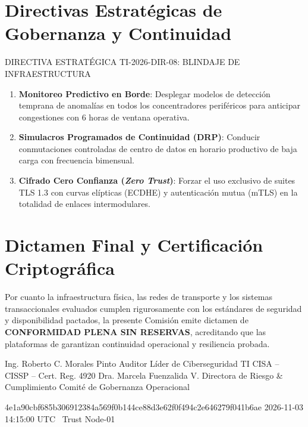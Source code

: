 \documentclass[11pt,letterpaper]{article}
\begin{document}
\newpage

\section{Directivas Estrat\'egicas de Gobernanza y Continuidad}

\begin{corpdirective}{DIRECTIVA ESTRAT\'EGICA TI-2026-DIR-08: BLINDAJE DE INFRAESTRUCTURA}
  \begin{enumerate}[leftmargin=1.5em, itemsep=3pt, topsep=2pt]
    \item \textbf{Monitoreo Predictivo en Borde}: Desplegar modelos de detecci\'on temprana de anomal\'ias en todos los concentradores perif\'ericos para anticipar congestiones con 6 horas de ventana operativa.
    \item \textbf{Simulacros Programados de Continuidad (DRP)}: Conducir conmutaciones controladas de centro de datos en horario productivo de baja carga con frecuencia bimensual.
    \item \textbf{Cifrado Cero Confianza (\textit{Zero Trust})}: Forzar el uso exclusivo de suites TLS 1.3 con curvas el\'ipticas (ECDHE) y autenticaci\'on mutua (mTLS) en la totalidad de enlaces intermodulares.
  \end{enumerate}
\end{corpdirective}

\section{Dictamen Final y Certificaci\'on Criptogr\'afica}

Por cuanto la infraestructura f\'isica, las redes de transporte y los sistemas transaccionales evaluados cumplen rigurosamente con los est\'andares de seguridad y disponibilidad pactados, la presente Comisi\'on emite dictamen de \textbf{CONFORMIDAD PLENA SIN RESERVAS}, acreditando que las plataformas de \textbf{\corporatebrandlegal} garantizan continuidad operacional y resiliencia probada.

\dualcontrolsignature
  {Ing. Roberto C. Morales Pinto}
  {Auditor L\'ider de Ciberseguridad TI}
  {CISA -- CISSP -- Cert. Reg. 4920}
  {Dra. Marcela Fuenzalida V.}
  {Directora de Riesgo \& Cumplimiento}
  {Comit\'e de Gobernanza Operacional}

\vspace{1.2em}

\cryptoseal
  {4e1a90cbf685b306912384a569f0b144ce88d3e62f0f494c2e646279f041b6ae}
  {2026-11-03 14:15:00 UTC}
  {\corporatebrandname\ Trust Node-01}
\end{document}
